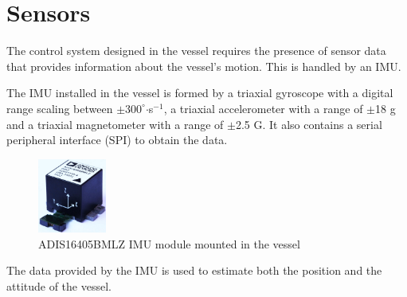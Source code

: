 \section{Sensors}\label{sec:sensors}
The control system designed in the vessel requires the presence of sensor data that provides information about the vessel's motion. This is handled by an IMU.

The IMU installed in the vessel is formed by a triaxial gyroscope with a digital range scaling between $\pm300^{\circ}$$\cdot$s$^{-1}$, a triaxial accelerometer with a range of $\pm$18 g and a triaxial magnetometer with a range of $\pm$\num{2.5} G. It also contains a serial peripheral interface (SPI) to obtain the data. \cite{IMUDatasheet}
%
\begin{figure}[H]
	\includegraphics[width=0.2\textwidth]{figures/IMU}
	\caption{ADIS16405BMLZ IMU module mounted in the vessel \cite{IMUFigure}}
	\label{fig:IMU}
\end{figure}
%
The data provided by the IMU is used to estimate both the position and the attitude of the vessel.


%
